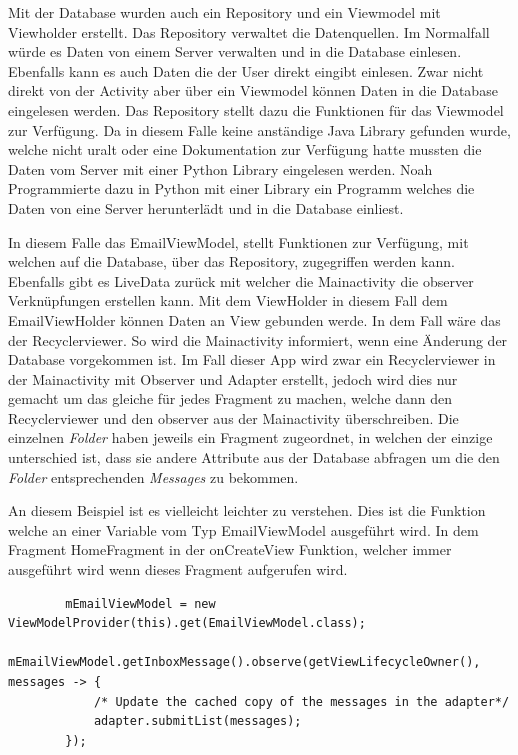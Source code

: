 \documentclass[a4paper,11pt]{article}
\begin{document}
Mit der Database wurden auch ein Repository und ein Viewmodel mit Viewholder erstellt. 
Das Repository verwaltet die Datenquellen. Im Normalfall würde es Daten von einem Server verwalten und in die Database einlesen. Ebenfalls kann
es auch Daten die der User direkt eingibt einlesen. Zwar nicht direkt von der Activity aber über ein Viewmodel können Daten in die Database eingelesen werden. Das Repository 
stellt dazu die Funktionen für das Viewmodel zur Verfügung. 
Da in diesem Falle keine anständige Java Library gefunden wurde, welche nicht uralt oder eine Dokumentation zur Verfügung hatte mussten die Daten vom Server mit einer 
Python Library eingelesen werden. Noah Programmierte dazu in Python mit einer Library ein Programm welches die Daten von eine Server herunterlädt und in die Database einliest. 

In diesem Falle das EmailViewModel, stellt Funktionen zur Verfügung, mit welchen auf die Database, über das Repository, zugegriffen werden kann. Ebenfalls gibt es LiveData zurück 
mit welcher die Mainactivity die observer Verknüpfungen erstellen kann. Mit dem ViewHolder in diesem Fall dem EmailViewHolder können Daten an View gebunden werde. In dem Fall wäre das 
der Recyclerviewer.
So wird die Mainactivity informiert, wenn eine Änderung der Database vorgekommen ist. Im Fall dieser App wird zwar 
ein Recyclerviewer in der Mainactivity mit Observer und Adapter erstellt, jedoch wird dies nur gemacht um das gleiche für jedes Fragment zu machen, welche dann den Recyclerviewer und den 
observer aus der Mainactivity überschreiben. Die einzelnen \textit{Folder} haben jeweils ein Fragment zugeordnet, in welchen der einzige unterschied ist, dass sie andere 
Attribute aus der Database abfragen um die den \textit{Folder} entsprechenden \textit{Messages} zu bekommen. 

An diesem Beispiel ist es vielleicht leichter zu verstehen. Dies ist die Funktion welche an einer Variable vom Typ EmailViewModel ausgeführt wird. In dem Fragment HomeFragment in der
onCreateView Funktion, welcher immer ausgeführt wird wenn dieses Fragment aufgerufen wird. 


\lstset{language=java}
\begin{lstlisting}
        mEmailViewModel = new ViewModelProvider(this).get(EmailViewModel.class);
        mEmailViewModel.getInboxMessage().observe(getViewLifecycleOwner(), messages -> {
            /* Update the cached copy of the messages in the adapter*/
            adapter.submitList(messages);
        });
\end{lstlisting}
\end{document}
